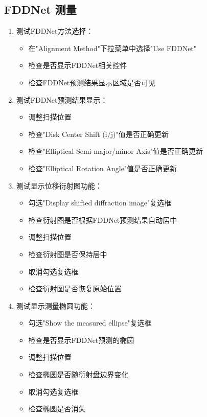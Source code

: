 \documentclass[a4paper,12pt]{report}	%
\begin{document}
\subsection{FDDNet 测量}
\begin{enumerate}
    \item 测试FDDNet方法选择：
    \begin{itemize}
        \item 在"Alignment Method"下拉菜单中选择"Use FDDNet"
        \item 检查是否显示FDDNet相关控件
        \item 检查FDDNet预测结果显示区域是否可见
    \end{itemize}

    \item 测试FDDNet预测结果显示：
    \begin{itemize}
        \item 调整扫描位置
        \item 检查"Disk Center Shift (i/j)"值是否正确更新
        \item 检查"Elliptical Semi-major/minor Axis"值是否正确更新
        \item 检查"Elliptical Rotation Angle"值是否正确更新
    \end{itemize}

    \item 测试显示位移衍射图功能：
    \begin{itemize}
        \item 勾选"Display shifted diffraction image"复选框
        \item 检查衍射图是否根据FDDNet预测结果自动居中
        \item 调整扫描位置
        \item 检查衍射图是否保持居中
        \item 取消勾选复选框
        \item 检查衍射图是否恢复原始位置
    \end{itemize}

    \item 测试显示测量椭圆功能：
    \begin{itemize}
        \item 勾选"Show the measured ellipse"复选框
        \item 检查是否显示FDDNet预测的椭圆
        \item 调整扫描位置
        \item 检查椭圆是否随衍射盘边界变化
        \item 取消勾选复选框
        \item 检查椭圆是否消失
    \end{itemize}


\end{enumerate}
\end{document}
